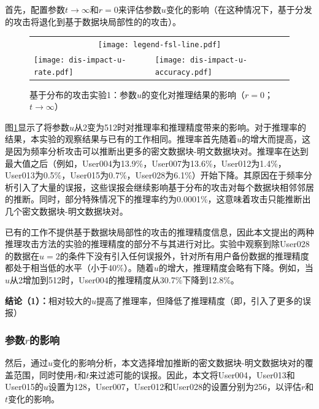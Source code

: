 首先，配置参数$t \rightarrow \infty$和$r = 0$来评估参数$u$变化的影响（在这种情况下，基于分发的攻击将退化到基于数据块局部性的的攻击\cite{li2017information}）。

\begin{figure}[!htbp]
    \centering
    \begin{tabular}{p{.48\linewidth}p{.48\linewidth}}
        \multicolumn{2}{c}{\texttt{[image: legend-fsl-line.pdf]}}  \\
        \texttt{[image: dis-impact-u-rate.pdf]} &
        \texttt{[image: dis-impact-u-accuracy.pdf]}\\
    \end{tabular}
    \caption{基于分布的攻击实验1：参数$u$的变化对推理结果的影响（$r = 0$；$t \rightarrow \infty$）}
    \label{fig:distribution-impact-u}
\end{figure}

图\ref{fig:distribution-impact-u}显示了将参数$u$从2变为512时对推理率和推理精度带来的影响。对于推理率的结果，本实验的观察结果与已有的工作\cite{li2017information}相同。推理率首先随着$u$的增大而提高，这是因为频率分析攻击可以推断出更多的密文数据块-明文数据块对。推理率在达到最大值之后（例如，User004为13.9\%，User007为13.6\%，User012为1.4\%，User013为0.5\%，User015为0.7\%，User028为6.1\%）开始下降。其原因在于频率分析引入了大量的误报，这些误报会继续影响基于分布的攻击对每个数据块相邻邻居的推断。同时，部分特殊情况下的推理率约为0.0001\%，这意味着攻击只能推断出几个密文数据块-明文数据块对。

已有的工作\cite{li2017information}不提供基于数据块局部性的攻击的推理精度信息，因此本文提出的两种推理攻击方法的实验的推理精度的部分不与其进行对比。实验中观察到除User028的数据在$u=2$的条件下没有引入任何误报外，针对所有用户备份数据的推理精度都处于相当低的水平（小于40\%）。随着$u$的增大，推理精度会略有下降。例如，当$u$从2增加到512时，User004的推理精度从30.7\%下降到12.8\%。
    
\textbf{结论（1）：}相对较大的$u$提高了推理率，但降低了推理精度（即，引入了更多的误报）


\subsubsection{参数$r$的影响}

然后，通过$u$变化的影响分析，本文选择增加推断的密文数据块-明文数据块对的覆盖范围，同时使用$r$和$t$来过滤可能的误报。因此，本文将User004，User013和User015的$u$设置为128，User007，User012和User028的设置分别为256，以评估$r$和$t$变化的影响。 

